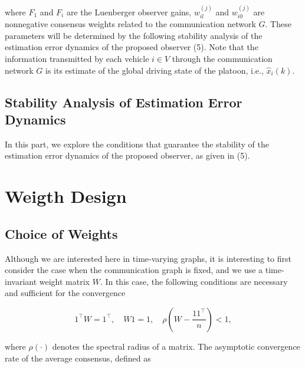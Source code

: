 \documentclass[letterpaper, 10pt, conference]{ieeeconf}  %
\begin{document}

where $F_1$ and $F_i$ are the Luenberger observer gains, $w_{il}^{(j)}$ and
$w_{i0}^{(j)}$ are nonnegative consensus weights related to the communication
network $G$. These parameters will be determined by the
following stability analysis of the estimation error dynamics of
the proposed observer (5). Note that the information transmitted
by each vehicle $i \in V$ through the communication network $G$ is
its estimate of the global driving state of the platoon, i.e., $\hat{x}_i(k)$.

\subsection{Stability Analysis of Estimation Error Dynamics}
In this part, we explore the conditions that guarantee the stability of the
estimation error dynamics of the proposed observer, as given in (5).

\section{Weigth Design}


\subsection{Choice of Weights}
Although we are interested here in time-varying graphs, it is interesting to first consider the case when the communication graph is fixed, and we use a time-invariant weight matrix $W$. In this case, the following conditions are necessary and sufficient for the convergence

\[
1^\top W = 1^\top, \quad W1 = 1, \quad \rho(W - \frac{11^\top}{n}) < 1,
\]

where $\rho(\cdot)$ denotes the spectral radius of a matrix. The asymptotic convergence rate of the average consensus, defined as
\end{document}
